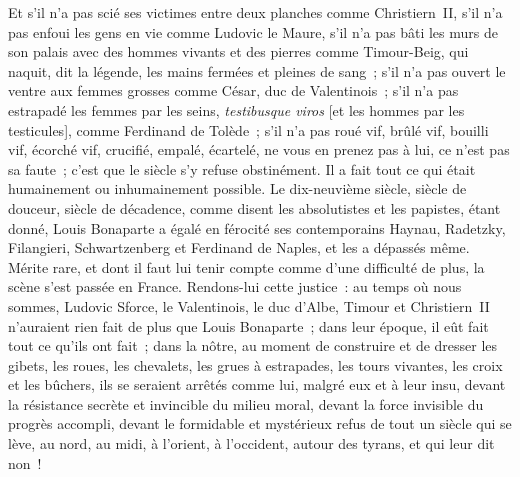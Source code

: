 \documentclass[french,twoside]{book} %
\begin{document}
Et s’il n’a pas scié ses victimes entre deux planches comme Christiern II, s’il n’a pas enfoui les gens en vie comme Ludovic le Maure, s’il n’a pas bâti les murs de son palais avec des hommes vivants et des pierres comme Timour-Beig, qui naquit, dit la légende, les mains fermées et pleines de sang ; s’il n’a pas ouvert le ventre aux femmes grosses comme César, duc de Valentinois ; s’il n’a pas estrapadé les femmes par les seins, \emph{testibusque viros} [et les hommes par les testicules], comme Ferdinand de Tolède ; s’il n’a pas roué vif, brûlé vif, bouilli vif, écorché vif, crucifié, empalé, écartelé, ne vous en prenez pas à lui, ce n’est pas sa faute ; c’est que le siècle s’y refuse obstinément. Il a fait tout ce qui était humainement ou inhumainement possible. Le dix-neuvième siècle, siècle de douceur, siècle de décadence, comme disent les absolutistes et les papistes, étant donné, Louis Bonaparte a égalé en férocité ses contemporains Haynau, Radetzky, Filangieri, Schwartzenberg et Ferdinand de Naples, et les a dépassés même. Mérite rare, et dont il faut lui tenir compte comme d’une difficulté de plus, la scène s’est passée en France. Rendons-lui cette justice : au temps où nous sommes, Ludovic Sforce, le Valentinois, le duc d’Albe, Timour et Christiern II n’auraient rien fait de plus que Louis Bonaparte ; dans leur époque, il eût fait tout ce qu’ils ont fait ; dans la nôtre, au moment de construire et de dresser les gibets, les roues, les chevalets, les grues à estrapades, les tours vivantes, les croix et les bûchers, ils se seraient arrêtés comme lui, malgré eux et à leur insu, devant la résistance secrète et invincible du milieu moral, devant la force invisible du progrès accompli, devant le formidable et mystérieux refus de tout un siècle qui se lève, au nord, au midi, à l’orient, à l’occident, autour des tyrans, et qui leur dit non !
\end{document}
